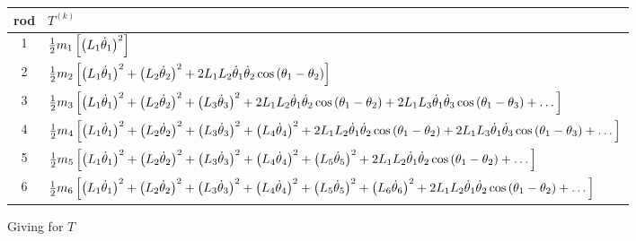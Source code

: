 \begin{tabular}{||c|l||}
    \cline{1-2}
    rod&$T^{(k)}$ \\
    \hline \hline
    1 & $\frac{1}{2} m_1 \left[\left(L_1\dot{\theta}_1\right)^2\right]$\\
    \hline \hline
    2 &$ \frac{1}{2} m_2\left[\left(L_1\dot{\theta}_1\right)^2+\left(L_2\dot{\theta}_2\right)^2+2 L_1L_{2}\dot{\theta}_1\dot{\theta}_{2}\cos\left(\theta_1 -\theta_{2}\right) \right]$\\
    \hline \hline
    3 &$ \frac{1}{2} m_3\left[\left(L_1\dot{\theta}_1\right)^2+\left(L_2\dot{\theta}_2\right)^2+\left(L_3\dot{\theta}_3\right)^2 +2 L_1L_{2}\dot{\theta}_1\dot{\theta}_{2}\cos\left(\theta_1 -\theta_{2}\right) +2 L_1L_{3}\dot{\theta}_1\dot{\theta}_{3}\cos\left(\theta_1 -\theta_{3}\right) +\dots \right]$\\
    \hline \hline
    4 &$ \frac{1}{2} m_4\left[\left(L_1\dot{\theta}_1\right)^2+\left(L_2\dot{\theta}_2\right)^2+\left(L_3\dot{\theta}_3\right)^2+\left(L_4\dot{\theta}_4\right)^2+2 L_1L_{2}\dot{\theta}_1\dot{\theta}_{2}\cos\left(\theta_1 -\theta_{2}\right) +2 L_1L_{3}\dot{\theta}_1\dot{\theta}_{3}\cos\left(\theta_1 -\theta_{3}\right) +\dots \right]$\\
    \hline \hline
    5 &$ \frac{1}{2} m_5\left[\left(L_1\dot{\theta}_1\right)^2+\left(L_2\dot{\theta}_2\right)^2+\left(L_3\dot{\theta}_3\right)^2+\left(L_4\dot{\theta}_4\right)^2+\left(L_5\dot{\theta}_5\right)^2+2 L_1L_{2}\dot{\theta}_1\dot{\theta}_{2}\cos\left(\theta_1 -\theta_{2}\right) +\dots \right]$\\
    \hline \hline
    6 &$ \frac{1}{2} m_6\left[\left(L_1\dot{\theta}_1\right)^2+\left(L_2\dot{\theta}_2\right)^2+\left(L_3\dot{\theta}_3\right)^2+\left(L_4\dot{\theta}_4\right)^2+\left(L_5\dot{\theta}_5\right)^2+\left(L_6\dot{\theta}_6\right)^2+2 L_1L_{2}\dot{\theta}_1\dot{\theta}_{2}\cos\left(\theta_1 -\theta_{2}\right)  +\dots \right]$\\
    \hline \hline
\end{tabular}
Giving for $T$
